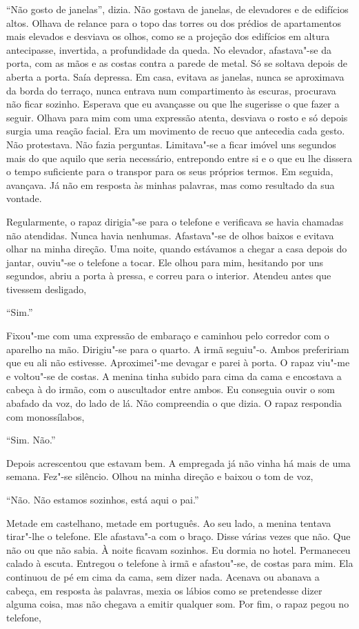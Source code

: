 ``Não gosto de janelas'',
dizia. Não gostava de janelas, de elevadores e de edifícios altos.
Olhava de relance para o topo das torres ou dos prédios de apartamentos
mais elevados e desviava os olhos, como se a projeção dos edifícios em
altura antecipasse, invertida, a profundidade da queda. No elevador,
afastava"-se da porta, com as mãos e as costas contra a parede de metal.
Só se soltava depois de aberta a porta. Saía depressa. Em casa, evitava
as janelas, nunca se aproximava da borda do terraço, nunca entrava num
compartimento às escuras, procurava não ficar sozinho. Esperava que eu
avançasse ou que lhe sugerisse o que fazer a seguir. Olhava para mim com
uma expressão atenta, desviava o rosto e só depois surgia uma reação
facial. Era um movimento de recuo que antecedia cada gesto. Não
protestava. Não fazia perguntas. Limitava"-se a ficar imóvel uns
segundos mais do que aquilo que seria necessário, entrepondo entre si e
o que eu lhe dissera o tempo suficiente para o transpor para os seus
próprios termos. Em seguida, avançava. Já não em resposta às minhas
palavras, mas como resultado da sua vontade.

Regularmente, o rapaz dirigia"-se para o telefone e verificava se havia
chamadas não atendidas. Nunca havia nenhumas. Afastava"-se de olhos
baixos e evitava olhar na minha direção. Uma noite, quando estávamos a
chegar a casa depois do jantar, ouviu"-se o telefone a tocar. Ele olhou
para mim, hesitando por uns segundos, abriu a porta à pressa, e correu
para o interior. Atendeu antes que tivessem desligado,

``Sim.''

Fixou"-me com uma expressão de embaraço e caminhou pelo corredor com o
aparelho na mão. Dirigiu"-se para o quarto. A irmã seguiu"-o. Ambos
prefeririam que eu ali não estivesse. Aproximei"-me devagar e parei à
porta. O rapaz viu"-me e voltou"-se de costas. A menina tinha subido
para cima da cama e encostava a cabeça à do irmão, com o auscultador
entre ambos. Eu conseguia ouvir o som abafado da voz, do lado de lá. Não
compreendia o que dizia. O rapaz respondia com monossílabos,

``Sim. Não.''

Depois acrescentou que estavam bem. A empregada já não vinha há mais de
uma semana. Fez"-se silêncio. Olhou na minha direção e baixou o tom de
voz,

``Não. Não estamos sozinhos, está aqui o pai.''

Metade em castelhano, metade em português. Ao seu lado, a menina tentava
tirar"-lhe o telefone. Ele afastava"-a com o braço. Disse várias vezes
que não. Que não ou que não sabia. À noite ficavam sozinhos. Eu dormia
no hotel. Permaneceu calado à escuta. Entregou o telefone à irmã e
afastou"-se, de costas para mim. Ela continuou de pé em cima da cama,
sem dizer nada. Acenava ou abanava a cabeça, em resposta às palavras,
mexia os lábios como se pretendesse dizer alguma coisa, mas não chegava
a emitir qualquer som. Por fim, o rapaz pegou no telefone,

